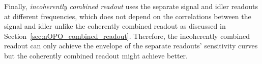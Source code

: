 Finally, \emph{incoherently combined readout} uses the separate signal and idler readouts at different frequencies, which does not depend on the correlations between the signal and idler unlike the coherently combined readout as discussed in Section~\ref{sec:nOPO_combined_readout}. Therefore, the incoherently combined readout can only achieve the envelope of the separate readouts' sensitivity curves but the coherently combined readout might achieve better.



